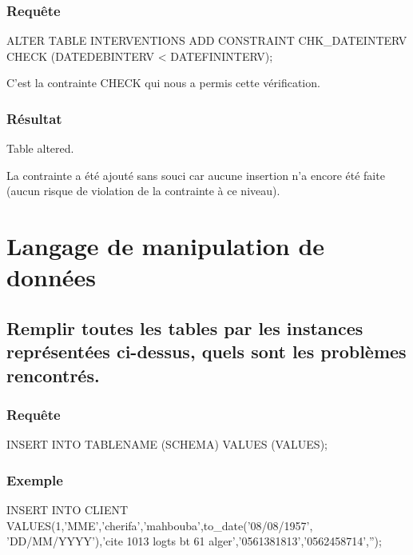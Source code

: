 \documentclass[•]{article}
\begin{document}
\subsubsection{Requête}
\begin{sql}
ALTER TABLE INTERVENTIONS ADD CONSTRAINT CHK_DATEINTERV CHECK (DATEDEBINTERV < DATEFININTERV);
\end{sql}
\textrm{C'est la contrainte CHECK qui nous a permis cette vérification.}
\subsubsection{Résultat}
\begin{sql}
Table altered.
\end{sql}
\textrm{La contrainte a été ajouté sans souci car aucune insertion n'a encore été faite (aucun risque de violation de la contrainte à ce niveau).}

\section{Langage de manipulation de données}
\subsection{Remplir toutes les tables par les instances représentées ci-dessus, quels sont les problèmes rencontrés.}
\subsubsection{Requête}
\begin{sql}
INSERT INTO TABLENAME (SCHEMA) VALUES (VALUES);
\end{sql}

\subsubsection{Exemple}
\begin{sql}
INSERT INTO CLIENT VALUES(1,'MME','cherifa','mahbouba',to_date('08/08/1957', 'DD/MM/YYYY'),'cite 1013 logts bt 61 alger','0561381813','0562458714','');
\end{sql}
\end{document}
